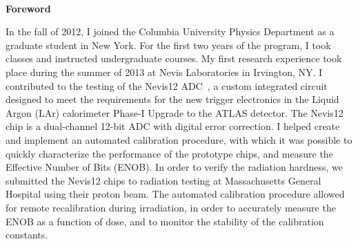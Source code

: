 ~\\[1in] %
\textbf{\Huge Foreword}\bigskip

\noindent 

In the fall of 2012, I joined the Columbia University Physics Department as a graduate student in New York. For the first two years of the program, I took classes and instructed undergraduate courses. 
My first research experience took place during the summer of 2013 at Nevis Laboratories in Irvington, NY. I contributed to the testing of the Nevis12 ADC~\cite{Nevis12_paper}, a custom integrated circuit designed to meet the requirements
for the new trigger electronics in the Liquid Argon (LAr) calorimeter Phase-I Upgrade to the ATLAS detector.
The Nevis12 chip is a dual-channel 12-bit ADC with digital error correction. I helped create and implement an automated calibration procedure, with which it was possible to quickly characterize the performance of the prototype chips, and measure the Effective Number of Bits (ENOB). In order to verify the radiation hardness, we submitted the Nevis12 chips to radiation testing at Massachusetts General Hospital using their proton beam. The automated calibration procedure allowed for remote recalibration during irradiation, in order to accurately measure the ENOB as a function of dose, and to monitor the stability of the calibration constants. 

